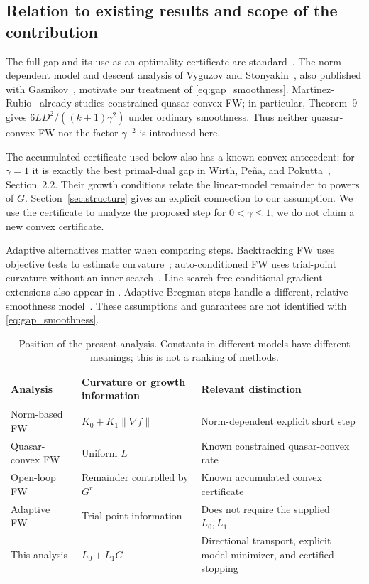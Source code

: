 \subsection{Relation to existing results and scope of the contribution}
The full gap and its use as an optimality certificate are standard~\cite{jaggi}.
The norm-dependent model and descent analysis of Vyguzov and
Stonyakin~\cite{vyguzov}, also published with Gasnikov~\cite{vyguzovjournal},
motivate our treatment of \eqref{eq:gap_smoothness}.
Mart\'{i}nez-Rubio~\cite{quasar} already studies constrained quasar-convex FW;
in particular, Theorem~9 gives $6LD^2/((k+1)\gamma^2)$ under ordinary
smoothness. Thus neither quasar-convex FW nor the factor $\gamma^{-2}$
is introduced here.

The accumulated certificate used below also has a known convex antecedent:
for $\gamma=1$ it is exactly the best primal-dual gap in
Wirth, Pe\~na, and Pokutta~\cite{wirth}, Section~2.2.
Their growth conditions relate the linear-model remainder to powers of $G$.
Section~\ref{sec:structure} gives an explicit connection to our assumption.
We use the certificate to analyze the proposed step for $0<\gamma\le1$;
we do not claim a new convex certificate.

Adaptive alternatives matter when comparing steps. Backtracking FW uses
objective tests to estimate curvature~\cite{pedregosa}; auto-conditioned FW
uses trial-point curvature without an inner search~\cite{acfw}.
Line-search-free conditional-gradient extensions also appear in
\cite{yagishita}. Adaptive Bregman steps handle a different, relative-smoothness
model~\cite{bregman}. These assumptions and guarantees are not identified
with \eqref{eq:gap_smoothness}.

\begin{table}[ht]
\centering\small
\caption{Position of the present analysis. Constants in different models
have different meanings; this is not a ranking of methods.}
\begin{tabular}{p{.23\linewidth}p{.34\linewidth}p{.34\linewidth}}
\toprule
Analysis & Curvature or growth information & Relevant distinction\\
\midrule
Norm-based FW~\cite{vyguzov} & $K_0+K_1\|\nabla f\|$ & Norm-dependent explicit short step\\
Quasar-convex FW~\cite{quasar} & Uniform $L$ & Known constrained quasar-convex rate\\
Open-loop FW~\cite{wirth} & Remainder controlled by $G^r$ & Known accumulated convex certificate\\
Adaptive FW~\cite{pedregosa,acfw} & Trial-point information & Does not require the supplied $L_0,L_1$\\
This analysis & $L_0+L_1G$ & Directional transport, explicit model minimizer, and certified stopping\\
\bottomrule
\end{tabular}
\end{table}

